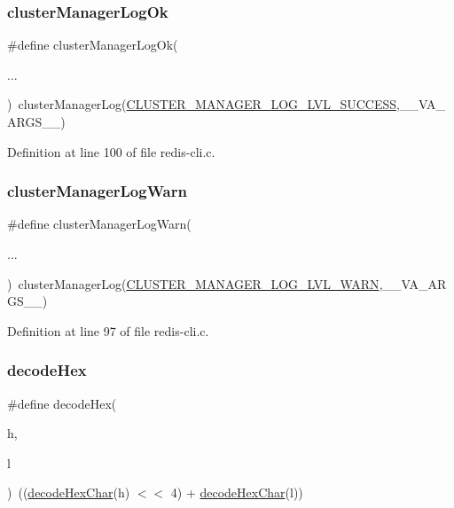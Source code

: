 \subsubsection{\texorpdfstring{cluster\+Manager\+Log\+Ok}{clusterManagerLogOk}}
{\footnotesize\ttfamily \#define cluster\+Manager\+Log\+Ok(\begin{DoxyParamCaption}\item[{}]{... }\end{DoxyParamCaption})~cluster\+Manager\+Log(\hyperlink{redis-cli_8c_a6a754ca7f60f191d71265d2c35c0cdde}{C\+L\+U\+S\+T\+E\+R\+\_\+\+M\+A\+N\+A\+G\+E\+R\+\_\+\+L\+O\+G\+\_\+\+L\+V\+L\+\_\+\+S\+U\+C\+C\+E\+SS},\+\_\+\+\_\+\+V\+A\+\_\+\+A\+R\+G\+S\+\_\+\+\_\+)}



Definition at line 100 of file redis-\/cli.\+c.

\mbox{\label{redis-cli_8c_a2b0dfe70c8d75e47b95362a8a45b70f2}} 
\subsubsection{\texorpdfstring{cluster\+Manager\+Log\+Warn}{clusterManagerLogWarn}}
{\footnotesize\ttfamily \#define cluster\+Manager\+Log\+Warn(\begin{DoxyParamCaption}\item[{}]{... }\end{DoxyParamCaption})~cluster\+Manager\+Log(\hyperlink{redis-cli_8c_a75e1edf48f2deecde01c5f5b7a3549c5}{C\+L\+U\+S\+T\+E\+R\+\_\+\+M\+A\+N\+A\+G\+E\+R\+\_\+\+L\+O\+G\+\_\+\+L\+V\+L\+\_\+\+W\+A\+RN},\+\_\+\+\_\+\+V\+A\+\_\+\+A\+R\+G\+S\+\_\+\+\_\+)}



Definition at line 97 of file redis-\/cli.\+c.

\mbox{\label{redis-cli_8c_ae03eb95fffcdab7dfa7faeadd04ad9f4}} 
\subsubsection{\texorpdfstring{decode\+Hex}{decodeHex}}
{\footnotesize\ttfamily \#define decode\+Hex(\begin{DoxyParamCaption}\item[{}]{h,  }\item[{}]{l }\end{DoxyParamCaption})~((\hyperlink{redis-cli_8c_ab610530dccdfe42adbac4677a568645a}{decode\+Hex\+Char}(h) $<$$<$ 4) + \hyperlink{redis-cli_8c_ab610530dccdfe42adbac4677a568645a}{decode\+Hex\+Char}(l))}



